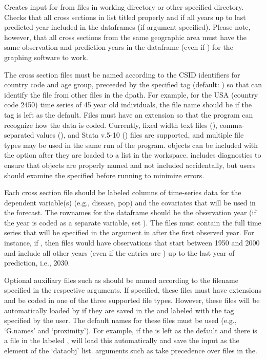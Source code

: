 \begin{Details}\relax
Creates  input for  from
files in working directory or other specified directory. Checks
that all cross sections in  list titled properly and
if all years up to last predicted year included in the dataframes
(if  argument specified). Please note, however,
that all cross sections from the same geographic area must have the
same observation and prediction years in the dataframe (even if
) for the graphing software  to
work.

The cross section files must be named according to the CSID
identifiers for country code and age group, preceeded by the
specified tag (default: ) so that  can
identify the file from other files in the dpath. For example, for
the USA (country code 2450) time series of 45 year old
individuals, the file name should be  if the
tag is left as the default. Files must have an extension so that
the program can recognize how the data is coded. Currently, fixed
width text files (), comma-separated values
(), and Stata v.5-10 () files are
supported, and multiple file types may be used in the same run of
the program.  objects can be included with the
 option after they are loaded to a list in the
workspace.  includes diagnostics to ensure that
objects are properly named and not included accidentally, but
users should examine the specified  before running
 to minimize errors.

Each cross section file should be labeled columns of time-series
data for the dependent variable(s) (e.g., disease, pop) and the
covariates that will be used in the forecast. The rownames for
the dataframe should be the observation year (if the year is
coded as a separate variable, set ). The
files must contain the full time series that will be specified in
the  argument in  after
the first observed year. For instance, if
, then files would have
observations that start between 1950 and 2000 and include all
other years (even if the entries are ) up to the last
year of prediction, i.e., 2030.

Optional auxiliary files such as  should be named
according to the filename specified in the respective
arguments. If specified, these files must have extensions and be
coded in one of the three supported file types. However, these
files will be automatically loaded by  if they are
saved in the  and labeled with the tag specified by the
user. The default names for these files must be used (e.g.,
`G.names' and `proximity'). For example,
if the  is left as the default and there is a file in the
 labeled , 
will load this
automatically and save the input as the  element of
the `dataobj' list.  arguments such as
 take precedence over  files in
the.


\end{Details}
